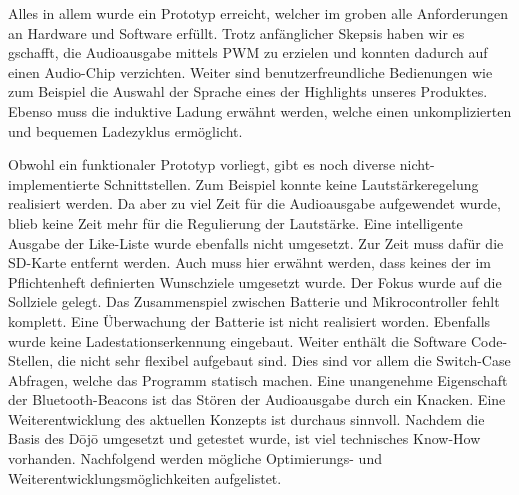 Alles in allem wurde ein Prototyp erreicht, welcher im groben alle Anforderungen an Hardware und Software erfüllt. Trotz anfänglicher Skepsis haben wir es gschafft, die Audioausgabe mittels PWM zu erzielen und konnten dadurch auf einen Audio-Chip verzichten. Weiter sind benutzerfreundliche Bedienungen wie zum Beispiel die Auswahl der Sprache eines der Highlights unseres Produktes. Ebenso muss die induktive Ladung erwähnt werden, welche einen unkomplizierten und bequemen Ladezyklus ermöglicht.

Obwohl ein funktionaler Prototyp vorliegt, gibt es noch diverse nicht-implementierte Schnittstellen. Zum Beispiel konnte keine Lautstärkeregelung realisiert werden. Da aber zu viel Zeit für die Audioausgabe aufgewendet wurde, blieb keine Zeit mehr für die Regulierung der Lautstärke. Eine intelligente Ausgabe der {\glqq Like-Liste\grqq} wurde ebenfalls nicht umgesetzt. Zur Zeit muss dafür die SD-Karte entfernt werden. Auch muss hier erwähnt werden, dass keines der im Pflichtenheft definierten Wunschziele umgesetzt wurde. Der Fokus wurde auf die Sollziele gelegt. Das Zusammenspiel zwischen Batterie und Mikrocontroller fehlt komplett. Eine Überwachung der Batterie ist nicht realisiert worden. Ebenfalls wurde keine Ladestationserkennung eingebaut. Weiter enthält die Software Code-Stellen, die nicht sehr flexibel aufgebaut sind. Dies sind vor allem die Switch-Case Abfragen, welche das Programm statisch machen. Eine unangenehme Eigenschaft der Bluetooth-Beacons ist das Stören der Audioausgabe durch ein {\glqq Knacken\grqq}.
Eine Weiterentwicklung des aktuellen Konzepts ist durchaus sinnvoll. Nachdem die Basis des Dōjō umgesetzt und getestet wurde, ist viel technisches \glqq Know-How \grqq vorhanden. Nachfolgend werden mögliche Optimierungs- und Weiterentwicklungsmöglichkeiten aufgelistet. 

